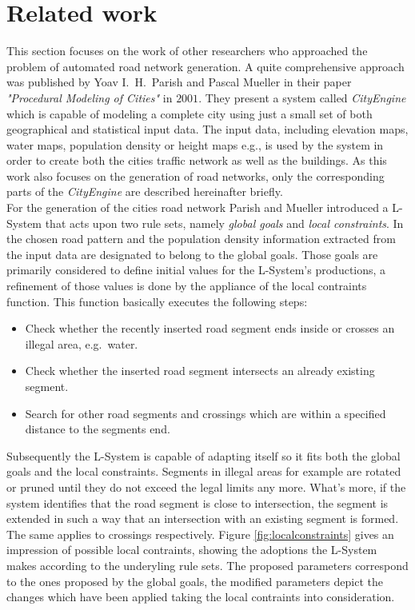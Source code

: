 \chapter{Related work}
\label{cha:related}

This section focuses on the work of other researchers who approached the problem of automated road network generation. A quite comprehensive approach was published by Yoav I.\ H.\ Parish and Pascal Mueller in their paper \emph{"Procedural Modeling of Cities"} in $2001$. They present a system called \emph{CityEngine} which is capable of modeling a complete city using just a small set of both geographical and statistical input data. The input data, including elevation maps, water maps, population density or height maps e.g., is used by the system in order to create both the cities traffic network as well as the buildings. As this work also focuses on the generation of road networks, only the corresponding parts of the \emph{CityEngine} are described hereinafter briefly.\\

\noindent
For the generation of the cities road network Parish and Mueller introduced a L-System that acts upon two rule sets, namely \emph{global goals} and \emph{local constraints}. In \cite{parish01} the chosen road pattern and the population density information extracted from the input data are designated to belong to the global goals. Those goals are primarily considered to define initial values for the L-System's productions, a refinement of those values is done by the appliance of the local contraints function. This function basically executes the following steps:\\

\begin{itemize}
	\item Check whether the recently inserted road segment ends inside or crosses an illegal area, e.g.\ water.
	\item Check whether the inserted road segment intersects an already existing segment.
	\item Search for other road segments and crossings which are within a specified distance to the segments end.\\
\end{itemize}

\noindent
Subsequently the L-System is capable of adapting itself so it fits both the global goals and the local constraints. Segments in illegal areas for example are rotated or pruned until they do not exceed the legal limits any more. What's more, if the system identifies that the road segment is close to intersection, the segment is extended in such a way that an intersection with an existing segment is formed. The same applies to crossings respectively. Figure \ref{fig:localconstraints} gives an impression of possible local contraints, showing the adoptions the L-System makes according to the underyling rule sets. The proposed parameters correspond to the ones proposed by the global goals, the modified parameters depict the changes which have been applied taking the local contraints into consideration.\\


